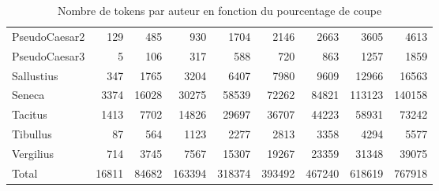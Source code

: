 \begin{table}[h]
\begin{tabular}{lrrrrrrrr}
 PseudoCaesar2 &   129    &   485    &    930   &   1704   &   2146    &   2663   &   3605   &   4613   \\
 PseudoCaesar3 &     5    &   106    &    317   &    588   &    720    &    863   &   1257   &   1859   \\
 Sallustius    &   347    &  1765    &   3204   &   6407   &   7980    &   9609   &  12966   &  16563   \\
 Seneca        &  3374    & 16028    &  30275   &  58539   &  72262    &  84821   & 113123   & 140158   \\
 Tacitus       &  1413    &  7702    &  14826   &  29697   &  36707    &  44223   &  58931   &  73242   \\
 Tibullus      &    87    &   564    &   1123   &   2277   &   2813    &   3358   &   4294   &   5577   \\
 Vergilius     &   714    &  3745    &   7567   &  15307   &  19267    &  23359   &  31348   &  39075   \\
 Total         & 16811    & 84682    & 163394   & 318374   & 393492    & 467240   & 618619   & 767918   \\
\hline
\end{tabular}
\caption{Nombre de tokens par auteur en fonction du pourcentage de coupe }
\label{table:lasla:extensibilite}
\end{table}


